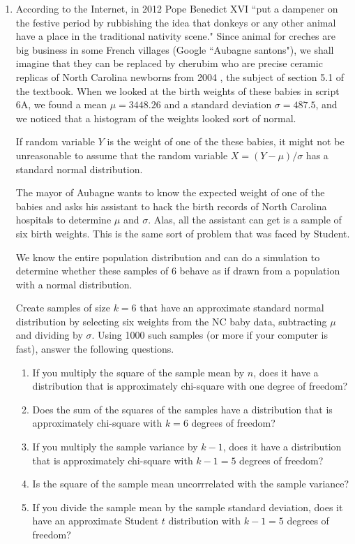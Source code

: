 \documentclass[12pt]{article}
\begin{document}
\begin{enumerate}
\pagebreak

\item 

According to the Internet, in 2012 Pope Benedict XVI ``put a dampener on the festive period by rubbishing the idea that donkeys or any other animal have a place in the traditional nativity scene." Since animal for creches are big business in some French villages (Google ``Aubagne santons"), we shall imagine that they can be replaced by cherubim who are precise ceramic replicas of North Carolina newborns from 2004 , the subject of section 5.1 of the textbook. When we looked at the birth weights of these babies in script 6A, we found a mean $\mu = 3448.26$ and a standard deviation $\sigma = 487.5$, and we noticed that a histogram of the weights looked sort of normal.

If random variable $Y$ is the weight of one of the these babies,  it might not be unreasonable to assume that the random variable $X = (Y - \mu)/\sigma$ has a standard normal distribution.

The mayor of Aubagne wants to know the expected weight of one of the babies and asks his assistant to hack the birth records of North Carolina hospitals to determine $\mu$ and $\sigma$. Alas, all the assistant can get is a sample of six birth weights. This is the same sort of problem that was faced by Student. 

We know the entire population distribution and can do a simulation to determine whether these samples of 6 behave as if drawn from a population with a normal distribution.

Create samples of size $k=6$ that have an approximate standard normal distribution by selecting six weights from the NC baby data, subtracting $\mu$ and dividing by $\sigma$. Using 1000 such samples (or more if your computer is fast), answer the following questions.

\begin{enumerate}
\item If you multiply the square of the sample mean by $n$, does it have a distribution that is approximately chi-square with one degree of freedom?
\item Does the sum of the squares of the samples have a distribution that is approximately chi-square with $k=6$ degrees of freedom?
\item If you multiply the sample variance by $k-1$, does it have a distribution that is approximately chi-square with $k-1=5$ degrees of freedom?
\item Is the square of the sample mean uncorrrelated with the sample variance?
\item If you divide the sample mean by the sample standard deviation, does it have an approximate Student $t$ distribution with $k-1=5$ degrees of freedom?
\end{enumerate}


\end{enumerate}
\end{document}
